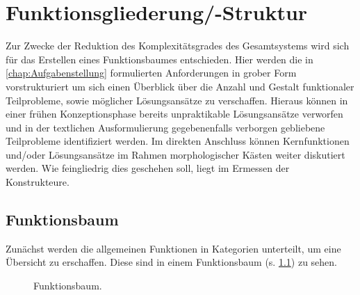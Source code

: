 \chapter{Funktionsgliederung/-Struktur}
	Zur Zwecke der Reduktion des Komplexitätsgrades des Gesamtsystems wird sich für das Erstellen eines Funktionsbaumes entschieden.
	Hier werden die in \cref{chap:Aufgabenstellung} formulierten Anforderungen in grober Form vorstrukturiert um sich einen Überblick über die Anzahl und Gestalt funktionaler Teilprobleme, sowie möglicher Lösungsansätze zu verschaffen.
	Hieraus können in einer frühen Konzeptionsphase bereits unpraktikable Lösungsansätze verworfen und in der textlichen Ausformulierung gegebenenfalls verborgen gebliebene Teilprobleme identifiziert werden.
	Im direkten Anschluss können Kernfunktionen und/oder Lösungsansätze im Rahmen morphologischer Kästen weiter diskutiert werden.
	Wie feingliedrig dies geschehen soll, liegt im Ermessen der Konstrukteure.

\section{Funktionsbaum}
	Zunächst werden die allgemeinen Funktionen in Kategorien unterteilt, um eine Übersicht zu erschaffen. Diese sind in einem Funktionsbaum (s. \cref{fig:funktionsbaum}) zu sehen.

	\begin{figure}[h]
		\centering
		
		\caption[Funktionsbaum]{Funktionsbaum.}
		\label{fig:funktionsbaum}
	\end{figure}


